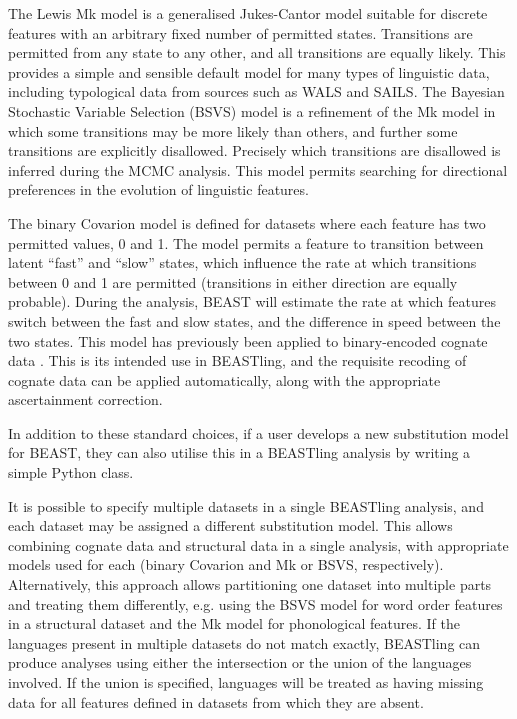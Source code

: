 \documentclass[twocolumn,10pt]{scrartcl}
\begin{document}
The Lewis Mk model\cite{Lewis2001} is a generalised Jukes-Cantor model suitable for discrete features with an arbitrary fixed number of permitted states.  Transitions are permitted from any state to any other, and all transitions are equally likely.  This provides a simple and sensible default model for many types of linguistic data, including typological data from sources such as WALS\cite{Dryer2013} and SAILS\cite{Muysken2014}.  The Bayesian Stochastic Variable Selection (BSVS) model is a refinement of the Mk model in which some transitions may be more likely than others, and further some transitions are explicitly disallowed.  Precisely which transitions are disallowed is inferred during the MCMC analysis.  This model permits searching for directional preferences in the evolution of linguistic features.

The binary Covarion model\cite{Penny2001} is defined for datasets where each feature has two permitted values, 0 and 1.  The model permits a feature to transition between latent ``fast'' and ``slow'' states, which influence the rate at which transitions between 0 and 1 are permitted (transitions in either direction are equally probable).  During the analysis, BEAST will estimate the rate at which features switch between the fast and slow states, and the difference in speed between the two states.  This model has previously been applied to binary-encoded cognate data \cite{Gray2009,Bouckaert2012}.  This is its intended use in BEASTling, and the requisite recoding of cognate data can be applied automatically, along with the appropriate ascertainment correction.

In addition to these standard choices, if a user develops a new substitution model for BEAST, they can also utilise this in a BEASTling analysis by writing a simple Python class.

It is possible to specify multiple datasets in a single BEASTling analysis, and each dataset may be assigned a different substitution model.  This allows combining cognate data and structural data in a single analysis, with appropriate models used for each (binary Covarion and Mk or BSVS, respectively).  Alternatively, this approach allows partitioning one dataset into multiple parts and treating them differently, e.g. using the BSVS model for word order features in a structural dataset and the Mk model for phonological features.  If the languages present in multiple datasets do not match exactly, BEASTling can produce analyses using either the intersection or the union of the languages involved.  If the union is specified, languages will be treated as having missing data for all features defined in datasets from which they are absent.
\end{document}
